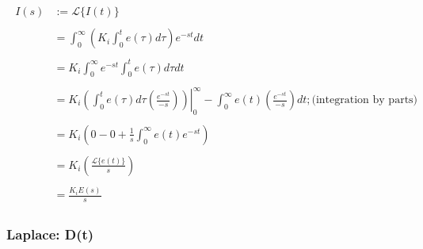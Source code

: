\documentclass[11pt]{article}
\theoremstyle{definition}
\begin{document}
\begin{align*}
    \begin{split}
        I(s) &:= \mathcal{L}\{I(t)\} \\\\
             &= \int_{0}^{\infty}\left(K_{i}\int_{0}^{t}e(\tau)d\tau\right)e^{-st}dt \\\\
             &= K_{i}\int_{0}^{\infty}e^{-st}\int_{0}^{t}e(\tau)d\tau dt \\\\
             &= \left.K_{i}\left(\int_{0}^{t}e(\tau)d\tau \left(\frac{e^{-st}}{-s}\right)\right)\right|_{0}^{\infty} - \int_{0}^{\infty}e(t)\left(\frac{e^{-st}}{-s}\right)dt; \text{(integration by parts)} \\\\
             &= K_{i}\left(0 - 0 + \frac{1}{s}\int_{0}^{\infty}e(t)e^{-st}\right) \\\\
             &= K_{i}\left(\frac{\mathcal{L}\{e(t)\}}{s}\right) \\\\
             &= \frac{K_{i}E(s)}{s} 
    \end{split}
\end{align*}

\subsubsection{Laplace: D(t)}
\end{document}
